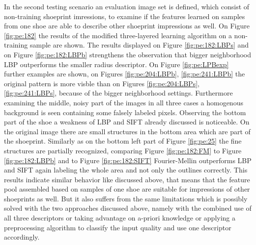\documentclass[draft,final]{vutinfth} %
\begin{document}
\par
In the second testing scenario an evaluation image set is defined, which consist of non-training shoeprint imressions, to examine if the features learned on samples from one shoe are able to describe other shoeprint impressions as well.
On Figure \ref{fig:pe:182} the results of the modified three-layered learning algorithm on a non-training sample are shown.
The results displayed on Figure \ref{fig:pe:182:LBPs} and on Figure \ref{fig:pe:182:LBPb} strengthens the observation that bigger neighborhood LBP outperforms the smaller radius descriptor.
On Figure \ref{fig:pe:LPBexp} further examples are shown, on Figures \ref{fig:pe:204:LBPb}, \ref{fig:pe:241:LBPb} the original pattern is more visble than on Figures \ref{fig:pe:204:LBPs}, \ref{fig:pe:241:LBPs}, because of the bigger neighborhood settings.
Furthermore examining the middle, noisy part of the images in all three cases a homogenous background is seen containing some falsely labeled pixels.
Observing the bottom part of the shoe a weakness of LBP and SIFT already discussed is noticeable.
On the original image there are small structures in the bottom area which are part of the shoeprint.
Similarly as on the bottom left part of Figure \ref{fig:pe:25} the fine structures are partially recognized, comparing Figure \ref{fig:pe:182:FM} to Figure \ref{fig:pe:182:LBPb} and to Figure \ref{fig:pe:182:SIFT} Fourier-Mellin outperforms LBP and SIFT again labeling the whole area and not only the outlines correctly.
This results indicate similar behavior like discussed above, that means that the feature pool assembled based on samples of one shoe are suitable for impressions of other shoeprints as well.
But it also suffers from the same limitations which is possibly solved with the two approaches discussed above, namely with the combined use of all three descriptors or taking advantage on a-priori knowledge or applying a preprocessing algorithm to classify the input quality and use one descriptor accordingly.
\end{document}

